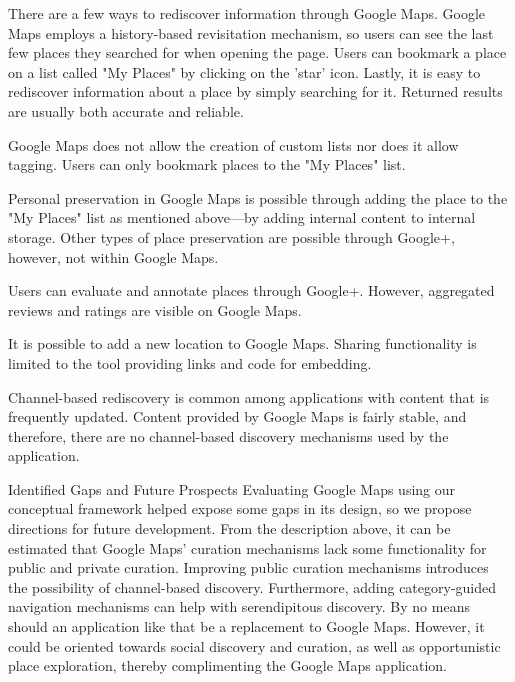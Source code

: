 {There are a few ways to rediscover information through Google Maps. Google Maps employs a history-based revisitation mechanism, so users can see the last few places they searched for when opening the page. Users can bookmark a place on a list called "My Places" by clicking on the 'star' icon. Lastly, it is easy to rediscover information about a place by simply searching for it. Returned results are usually both accurate and reliable.

Google Maps does not allow the creation of custom lists nor does it allow tagging. Users can only bookmark places to the "My Places" list. 

Personal preservation in Google Maps is possible through adding the place to the "My Places" list as mentioned above---by adding internal content to internal storage. Other types of place preservation are possible through Google+, however, not within Google Maps.

Users can evaluate and annotate places through Google+. However, aggregated reviews and ratings are visible on Google Maps. 

It is possible to add a new location to Google Maps. Sharing functionality is limited to the tool providing links and code for embedding.  

Channel-based rediscovery is common among applications with content that is frequently updated. Content provided by Google Maps is fairly stable, and therefore, there are no channel-based discovery mechanisms used by the application.

Identified Gaps and Future Prospects
Evaluating Google Maps using our conceptual framework helped expose some gaps in its design, so we propose directions for future development. From the description above, it can be estimated that Google Maps' curation mechanisms lack some functionality for public and private curation. Improving public curation mechanisms introduces the possibility of channel-based discovery. Furthermore, adding category-guided navigation mechanisms can help with serendipitous discovery. By no means should an application like that be a replacement to Google Maps. However, it could be oriented towards social discovery and curation, as well as opportunistic place exploration, thereby complimenting the Google Maps application.  

} %

